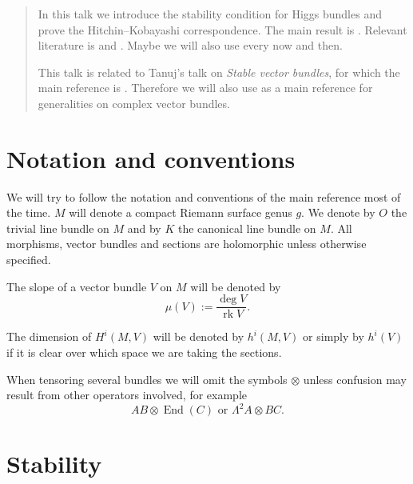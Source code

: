 \documentclass[A4paper, 12pt, british, reqno]{amsart}
\DeclareMathOperator{\End}{End}
\DeclareMathOperator{\rk}{rk}
\newcommand{\ot}{\otimes}
\begin{document}
\maketitle

\begin{abstract}
    In this talk we introduce the stability condition for Higgs bundles and prove the Hitchin--Kobayashi correspondence.
    The main result is \cite[Theorem 4.3]{hit87a}.
    Relevant literature is \cite[\S 3 and \S 4]{hit87a} and \cite[\S 2 and \S 3]{wen14}.
    Maybe we will also use \cite{wen16} every now and then.

    This talk is related to Tanuj's talk on \textit{Stable vector bundles}, for which the main reference is \cite{kob87}.
    Therefore we will also use \cite{kob87} as a main reference for generalities on complex vector bundles.
\end{abstract}

\tableofcontents

\section*{Notation and conventions}

We will try to follow the notation and conventions of the main reference \cite{hit87a} most of the time.
$M$ will denote a compact Riemann surface genus $g$.
We denote by $O$ the trivial line bundle on $M$ and by $K$ the canonical line bundle on $M$.
All morphisms, vector bundles and sections are holomorphic unless otherwise specified.

The slope of a vector bundle $V$ on $M$ will be denoted by
\[ \mu(V):=\frac{\deg{V}}{\rk{V}}. \]

The dimension of $H^{i}(M,V)$ will be denoted by $h^{i}(M,V)$ or simply by $h^{i}(V)$ if it is clear over which space we are taking the sections.

When tensoring several bundles we will omit the symbols $\ot$ unless confusion may result from other operators involved, for example
\[ AB\ot \End(C) \text{ or } \Lambda^{2}A\ot BC. \]

\section{Stability}

\end{document}
